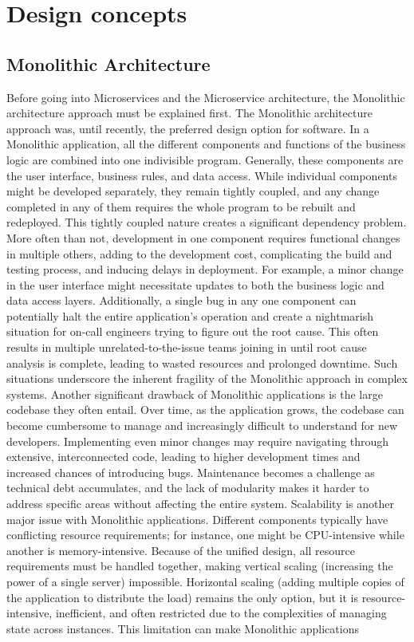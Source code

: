 \chapter{Design concepts} \label{ch:design_concepts}

\section{Monolithic Architecture}

Before going into Microservices and the Microservice architecture, the Monolithic architecture approach must be explained first. The Monolithic architecture approach was, until recently, the preferred design option for software. In a Monolithic application, all the different components and functions of the business logic are combined into one indivisible program\cite{monovsmicro}. Generally, these components are the user interface, business rules, and data access. While individual components might be developed separately, they remain tightly coupled\cite{whatismono}, and any change completed in any of them requires the whole program to be rebuilt and redeployed\cite{app10175797}. This tightly coupled nature creates a significant dependency problem. More often than not, development in one component requires functional changes in multiple others, adding to the development cost, complicating the build and testing process, and inducing delays in deployment. For example, a minor change in the user interface might necessitate updates to both the business logic and data access layers. Additionally, a single bug in any one component can potentially halt the entire application's operation and create a nightmarish situation for on-call engineers trying to figure out the root cause. This often results in multiple unrelated-to-the-issue teams joining in until root cause analysis is complete, leading to wasted resources and prolonged downtime. Such situations underscore the inherent fragility of the Monolithic approach in complex systems. Another significant drawback of Monolithic applications is the large codebase they often entail. Over time, as the application grows, the codebase can become cumbersome to manage and increasingly difficult to understand for new developers\cite{whatismono}. Implementing even minor changes may require navigating through extensive, interconnected code, leading to higher development times and increased chances of introducing bugs. Maintenance becomes a challenge as technical debt accumulates, and the lack of modularity makes it harder to address specific areas without affecting the entire system. Scalability is another major issue with Monolithic applications. Different components typically have conflicting resource requirements; for instance, one might be CPU-intensive while another is memory-intensive. Because of the unified design, all resource requirements must be handled together, making vertical scaling (increasing the power of a single server) impossible. Horizontal scaling (adding multiple copies of the application to distribute the load) remains the only option, but it is resource-intensive, inefficient, and often restricted due to the complexities of managing state across instances. This limitation can make Monolithic applications 